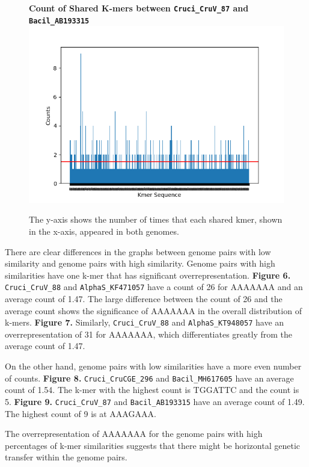 \documentclass[eng]{ajceam-class}
\begin{document}
\begin{figure}
    \centering
    \textbf{Count of Shared K-mers between \texttt{Cruci\_CruV\_87} and \texttt{Bacil\_AB193315}}
    \includegraphics[scale = 0.5]{ComparisonBetweenCruci87DNAAB19331.png}
    \caption{The y-axis shows the number of times that each shared kmer, shown in the x-axis, appeared in both genomes.}
\end{figure}
There are clear differences in the graphs between genome pairs with low similarity and genome pairs with high similarity. Genome pairs with high similarities have one k-mer that has significant overrepresentation. \textbf{Figure 6.} \texttt{Cruci\_CruV\_88} and \texttt{AlphaS\_KF471057} have a count of 26 for AAAAAAA and an average count of 1.47. The large difference between the count of 26 and the average count shows the significance of AAAAAAA in the overall distribution of k-mers. \textbf{Figure 7.} Similarly, \texttt{Cruci\_CruV\_88} and \texttt{AlphaS\_KT948057} have an overrepresentation of 31 for AAAAAAA, which differentiates greatly from the average count of 1.47. 

On the other hand, genome pairs with low similarities have a more even number of counts. \textbf{Figure 8.} \texttt{Cruci\_CruCGE\_296} and \texttt{Bacil\_MH617605} have an average count of 1.54. The k-mer with the highest count is TGGATTC and the count is 5. \textbf{Figure 9.} \texttt{Cruci\_CruV\_87} and \texttt{Bacil\_AB193315} have an average count of 1.49. The highest count of 9 is at AAAGAAA. 

The overrepresentation of AAAAAAA for the genome pairs with high percentages of k-mer similarities suggests that there might be horizontal genetic transfer within the genome pairs. 
\end{document}
